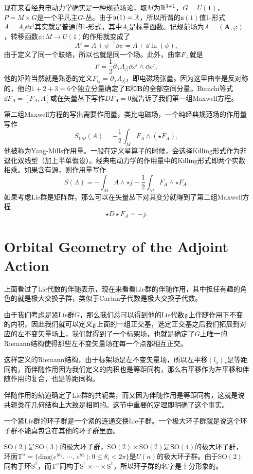 现在来看经典电动力学确实是一种规范场论，取$M$为$\mathbb{R}^{3+1}$，$G=U(1)$，$P=M\times G$是一个平凡主$G$-丛。由于$\mathfrak{u}(1)=\mathbb{R}$，所以所谓的$\mathfrak{u}(1)$值1-形式$A=A_i\dd x^i$其实就是普通的1-形式，其中$A_i$是标量函数。记规范场为$A=(\bm{A},\varphi)$，转移函数$\psi:M\to U(1)$的作用就变成了
\[
	A'=A+\psi^{-1} \dd \psi=A+\dd \ln(\psi),
\]
由于定义了同一个联络，所以也就是同一个场。此外，曲率$F_A$就是
\[
	F=\frac{1}{2}\partial_{[i}A_{j]}\dd x^i\wedge \dd x^j,
\]
他的矩阵当然就是熟悉的定义$F_{ij}=\partial_{[i}A_{j]}$，即电磁场张量。因为这里曲率是反对称的，他的$1+2+3=6$个独立分量确定了$\bm{E}$和$\bm{B}$的全部空间分量。Bianchi等式$\dd F_A=[F_A,A]$或在矢量丛下写作$DF_A=0$就告诉了我们第一组Maxwell方程。

第二组Maxwell方程的写出需要作用量，类比电磁场，一个纯经典规范场的作用量写作
\[
	S_{YM}(A)=-\frac{1}{2}\int_M F_A\wedge(\star F_A),
\]
他被称为Yang-Mills作用量。一般在定义星算子的时候，会选择Killing形式作为非退化双线型（加上半单假设）。经典电动力学的作用量中的Killing形式即两个实数相乘。如果含有源，则作用量写作
\[
	S(A)=-\int_M A\wedge\star j-\frac{1}{2}\int_M F_A\wedge\star F_A.
\]
如果考虑Lie群是矩阵群，那么可以在矢量丛下对其变分就得到了第二组Maxwell方程
\[
	\star D\star F_A=-j.
\]

\section{Orbital Geometry of the Adjoint Action}

上面看过了Lie代数的伴随表示，现在来看看Lie群的伴随作用，其中担任有趣的角色的就是极大交换子群，类似于Cartan子代数是极大交换子代数。

由于我们考虑是紧Lie群$G$，那么我们总可以得到他的Lie代数${\mathfrak{g}}$上伴随作用下不变的内积，因此我们就可以定义${\mathfrak{g}}$上面的一组正交基，选定正交基之后我们拓展到对应的左不变矢量场上，我们就得到了一个标架场，也就是确定了$G$上唯一的Riemann结构使得那些左不变矢量场在每一个点都相互正交。

这样定义的Riemann结构，由于标架场是左不变矢量场，所以左平移$(l_a)_*$是等距同构，而伴随作用因为我们定义的内积也是等距同构，那么右平移作为左平移和伴随作用的复合，也是等距同构。

伴随作用的轨道确定了Lie群的共轭类，而又因为伴随作用是等距同构，这就是说共轭类在几何结构上大致是相同的。这节中重要的定理即明确了这个事实。

\para 一个紧Lie群的环子群是一个紧的连通交换Lie子群。一个极大环子群就是说这个环子群不能真包含在其他的环子群里面。

$\mathrm{SO}(2)$是$\mathrm{SO}(3)$的极大环子群，$\mathrm{SO}(2)\times \mathrm{SO}(2)$是$\mathrm{SO}(4)$的极大环子群，环面$\mathrm{T}^n=\{\mathrm{diag}(e^{i\theta_1}$, $\cdots$, $e^{i\theta_n}):0\leq\theta_i<2\pi\}$是$U(n)$的极大环子群。由于$\mathrm{SO}(2)$同构于环$\mathrm{S}^1$，而$\mathrm{T}^n$同构于$\mathrm{S}^1\times\cdots\times\mathrm{S}^1$，所以环子群的名字是十分形象的。

